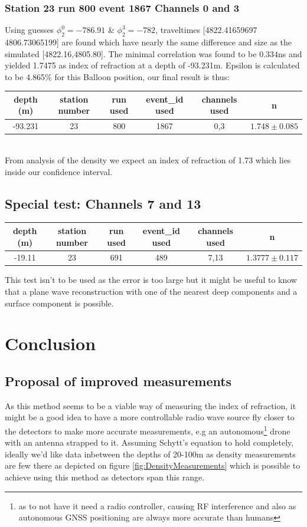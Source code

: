 \documentclass[11pt,a4paper,faculty=we,language=en,doctype=report]{cls/ugent-doc}
\begin{document}
\subsection{Station 23 run 800 event 1867 Channels 0 and 3}
Using guesses $\phi_2^0 = -786.91$ \& $\phi_2^3 = -782$, traveltimes
[4822.41659697 4806.73065199] are found which have nearly the same difference
and size as the simulated [4822.16,4805.80]. The minimal correlation was found to be
$0.334$ns and yielded 1.7475 as index of refraction at a depth of -93.231m.
Epsilon is calculated to be 4.865\% for this Balloon position, our final result is 
thus:
\begin{table}[h]
    \centering
    \begin{tabular}{c|c|c|c|c|c}
      depth (m)& station number & run used & event\_id used & channels used & n\\
      \hline
      -93.231& 23 & 800 & 1867 & 0,3 & $1.748 \pm 0.085$
    \end{tabular}
\end{table}\\
From analysis of the density we expect an index of refraction of 1.73 which
lies inside our confidence interval.

\section{Special test: Channels 7 and 13}
\begin{table}[h]
    \centering
    \begin{tabular}{c|c|c|c|c|c}
      depth (m)& station number & run used & event\_id used & channels used & n\\
      \hline
      -19.11& 23 & 691 & 489 & 7,13 & $1.3777 \pm 0.117$
    \end{tabular}
\end{table}
This test isn't to be used as the error is too large but it might be useful
to know that a plane wave reconstruction with one of the nearest deep components and
a surface component is possible.

\chapter*{Conclusion}
\section*{Proposal of improved measurements}
As this method seems to be a viable way of measuring the index of refraction,
it might be a good idea to have a more controllable radio wave source fly
closer to the detectors to make more accurate measurements, e.g an
autonomous\footnote{as to not have it need a radio controller, causing RF interference 
and also as autonomous GNSS positioning are always more accurate than humans} drone with an
antenna strapped to it.  Assuming Schytt's equation to hold completely, ideally
we'd like data inbetween the depths of 20-100m as density measurements are few
there as depicted on figure \ref{fig:DensityMeasurements} which is possible to
achieve using this method as detectors span this range.
\end{document}

